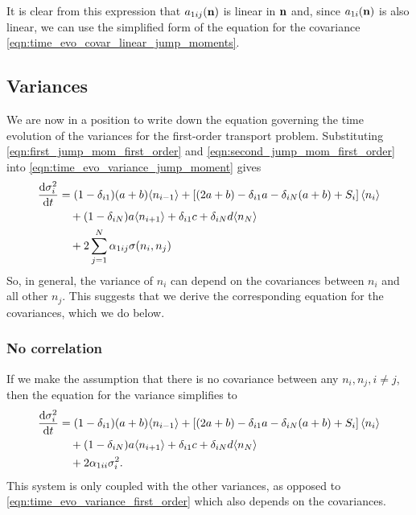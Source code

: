 It is clear from this expression that \(a_{1ij}(\mathbf{n})\) is linear in \(\mathbf{n}\)
and, since \(a_{1i}(\mathbf{n})\) is also linear, we can use the simplified form of
the equation for the covariance \eqref{eqn:time_evo_covar_linear_jump_moments}.

\subsection{Variances}
We are now in a position to write down the equation governing the time
evolution of the variances for the first-order transport problem. Substituting
\eqref{eqn:first_jump_mom_first_order} and
\eqref{eqn:second_jump_mom_first_order} into
\eqref{eqn:time_evo_variance_jump_moment} gives
\begin{equation}
    \begin{aligned}
        \frac{\mathrm{d} \sigma_i^2}{\mathrm{d} t} &= (1-\delta_{i1})(a+b)\langle n_{i-1} \rangle +
        \left[(2a+b) - \delta_{i1}a - \delta_{iN}(a+b) + S_i\right]\langle n_i \rangle\\
        &\quad+ (1-\delta_{iN})a\langle n_{i+1} \rangle + \delta_{i1}c + \delta_{iN}d \langle n_N \rangle\\
        &\quad+ 2 \sum_{j=1}^N \alpha_{1ij} \sigma(n_i,n_j)
    \end{aligned}
    \label{eqn:time_evo_variance_first_order}
\end{equation}
So, in general, the variance of \(n_i\) can depend on the covariances between
\(n_i\) and all other \(n_j\). This suggests that we derive the corresponding
equation for the covariances, which we do below.

\subsubsection{No correlation}
If we make the assumption that there is no covariance between any \(n_i, n_j,
i\neq j\), then the equation for the variance simplifies to
\begin{equation}
    \begin{aligned}
        \frac{\mathrm{d} \sigma_i^2}{\mathrm{d} t} &= (1-\delta_{i1})(a+b)\langle n_{i-1} \rangle +
        \left[(2a+b) - \delta_{i1}a - \delta_{iN}(a+b) + S_i\right]\langle n_i \rangle\\
        &\quad+ (1-\delta_{iN})a\langle n_{i+1} \rangle + \delta_{i1}c + \delta_{iN}d \langle n_N \rangle\\
        &\quad+ 2 \alpha_{1ii} \sigma_i^2.
    \end{aligned}
    \label{eqn:time_evo_variance_first_order_no_corr}
\end{equation}
This system is only coupled with the other variances, as opposed to
\eqref{eqn:time_evo_variance_first_order} which also depends on the covariances.

